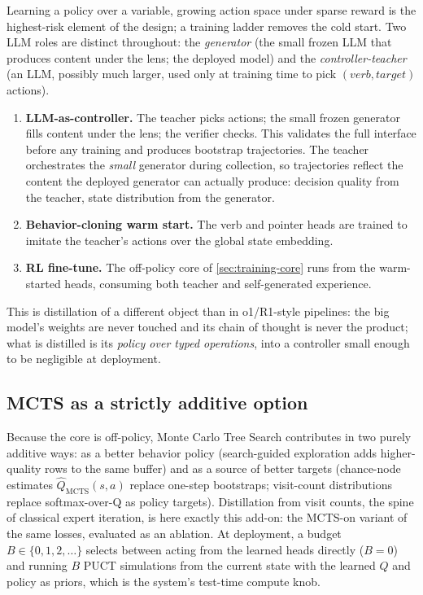 

Learning a policy over a variable, growing action space under sparse reward
is the highest-risk element of the design; a training ladder removes the
cold start. Two LLM roles are distinct throughout: the \emph{generator} (the
small frozen LLM that produces content under the lens; the deployed model)
and the \emph{controller-teacher} (an LLM, possibly much larger, used only
at training time to pick $(\textit{verb}, \textit{target})$ actions).

\begin{enumerate}[leftmargin=1.5em, itemsep=1pt]
\item \textbf{LLM-as-controller.} The teacher picks actions; the small
frozen generator fills content under the lens; the verifier checks. This
validates the full interface before any training and produces bootstrap
trajectories. The teacher orchestrates the \emph{small} generator during
collection, so trajectories reflect the content the deployed generator can
actually produce: decision quality from the teacher, state distribution from
the generator.
\item \textbf{Behavior-cloning warm start.} The verb and pointer heads are
trained to imitate the teacher's actions over the global state embedding.
\item \textbf{RL fine-tune.} The off-policy core of
\cref{sec:training-core} runs from the warm-started heads, consuming both
teacher and self-generated experience.
\end{enumerate}

This is distillation of a different object than in o1/R1-style pipelines:
the big model's weights are never touched and its chain of thought is never
the product; what is distilled is its \emph{policy over typed operations},
into a controller small enough to be negligible at deployment.

\subsection{MCTS as a strictly additive option}
\label{sec:training-mcts}

Because the core is off-policy, Monte Carlo Tree Search contributes in two
purely additive ways: as a better behavior policy (search-guided
exploration adds higher-quality rows to the same buffer) and as a source of
better targets (chance-node estimates $\hat{Q}_{\mathrm{MCTS}}(s,a)$ replace
one-step bootstraps; visit-count distributions replace softmax-over-Q as
policy targets). Distillation from visit counts, the spine of classical
expert iteration, is here exactly this add-on: the MCTS-on variant of the
same losses, evaluated as an ablation. At deployment, a budget
$B \in \{0, 1, 2, \dots\}$ selects between acting from the learned heads
directly ($B{=}0$) and running $B$ PUCT simulations from the current state
with the learned $Q$ and policy as priors, which is the system's test-time
compute knob. 
